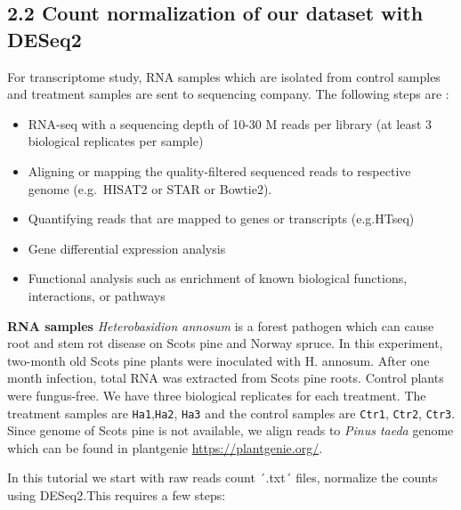 \documentclass[
]{article}
\begin{document}
\subsection{2.2 Count normalization of our dataset with
DESeq2}\label{count-normalization-of-our-dataset-with-deseq2}

For transcriptome study, RNA samples which are isolated from control
samples and treatment samples are sent to sequencing company. The
following steps are :

\begin{itemize}
\item
  RNA-seq with a sequencing depth of 10-30 M reads per library (at least
  3 biological replicates per sample)
\item
  Aligning or mapping the quality-filtered sequenced reads to respective
  genome (e.g.~HISAT2 or STAR or Bowtie2).
\item
  Quantifying reads that are mapped to genes or transcripts (e.g.HTseq)
\item
  Gene differential expression analysis
\item
  Functional analysis such as enrichment of known biological functions,
  interactions, or pathways
\end{itemize}

\textbf{RNA samples} \emph{Heterobasidion annosum} is a forest pathogen
which can cause root and stem rot disease on Scots pine and Norway
spruce. In this experiment, two-month old Scots pine plants were
inoculated with H. annosum. After one month infection, total RNA was
extracted from Scots pine roots. Control plants were fungus-free. We
have three biological replicates for each treatment. The treatment
samples are \texttt{Ha1},\texttt{Ha2}, \texttt{Ha3} and the control
samples are \texttt{Ctr1}, \texttt{Ctr2}, \texttt{Ctr3}. Since genome of
Scots pine is not available, we align reads to \emph{Pinus taeda} genome
which can be found in plantgenie \url{https://plantgenie.org/}.

In this tutorial we start with raw reads count ´.txt´ files, normalize
the counts using DESeq2.This requires a few steps:
\end{document}
